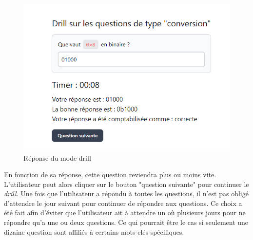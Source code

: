 \begin{center}
    \begin{figure}[H]
        \includegraphics[width=\textwidth]{./assets/figures/drill3.png}
        \caption{Réponse du mode drill}
    \end{figure}
\end{center}

En fonction de sa réponse, cette question reviendra plus ou moins vite. L'utilisateur peut alors cliquer sur le bouton "question suivante" pour continuer le \emph{drill}.
Une fois que l'utilisateur a répondu à toutes les questions, il n'est pas obligé d'attendre le jour suivant pour continuer de répondre aux questions. Ce choix a été fait afin d'éviter que l'utilisateur ait à attendre un où plusieurs jours pour ne répondre qu'a une ou deux questions. Ce qui pourrait être le cas si seulement une dizaine question sont affiliés à certains mots-clés spécifiques.